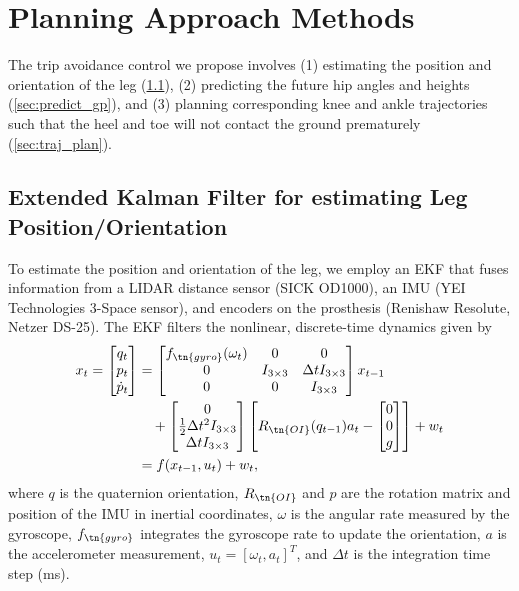 \section{Planning Approach Methods}
The trip avoidance control we propose involves (1) estimating the position and
orientation of the leg (\cref{sec:hip_kalman}), (2) predicting the future hip
angles and heights (\cref{sec:predict_gp}), and (3) planning corresponding knee
and ankle trajectories such that the heel and toe will not contact the ground
prematurely (\cref{sec:traj_plan}).

\subsection{Extended Kalman Filter for estimating Leg Position/Orientation}
\label{sec:hip_kalman}

To estimate the position and orientation of the leg, we employ an EKF that fuses
information from a LIDAR distance sensor (SICK OD1000), an IMU (YEI Technologies
3-Space sensor), and encoders on the prosthesis (Renishaw Resolute, Netzer
DS-25). The EKF filters the nonlinear, discrete-time dynamics given by
\begin{align}
    x_{t} = \begin{bmatrix} q_t \\ p_t \\ \dot{p}_t \end{bmatrix}
        &= \begin{bmatrix} f_\tn{gyro}(\omega_t) & 0 & 0 \\
            0 & I_{3\times3} & \Delta t  I_{3\times3}\\
            0 & 0 & I_{3\times3} \end{bmatrix} x_{t-1} \notag \\
        &\quad+ \begin{bmatrix} 0 \\ \frac{1}{2} \Delta t^2 I_{3\times3} \\ 
            \Delta t I_{3\times3} \end{bmatrix} 
        \begin{bmatrix} R_\tn{OI}(q_{t-1}) a_t - \begin{bmatrix} 0 \\ 0 \\ g 
            \end{bmatrix} \end{bmatrix} + w_t \label{eq:dynamics}\\
            &= f(x_{t-1}, u_t) + w_t  \notag ,
\end{align}
where $q$ is the quaternion orientation, $R_\tn{OI}$ and $p$ are the rotation
matrix and position of the IMU in inertial coordinates, $\omega$ is the angular
rate measured by the gyroscope, $f_\tn{gyro}$ integrates the gyroscope rate to
update the orientation, $a$ is the accelerometer measurement, $u_t =
\left[\omega_t, a_t \right]^T$, and $\Delta t$ is the integration time step
(\unit[1]{ms}). 

